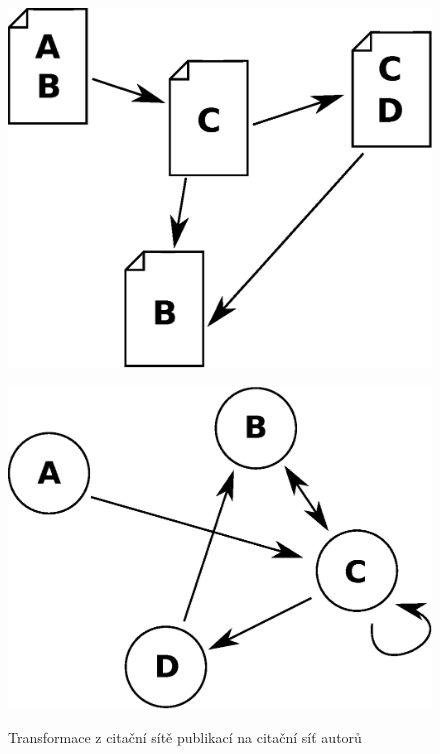 \documentclass{bakalarka}
\begin{document}
\begin{figure}[!ht]
\begin{minipage}[b]{0.45\textwidth}
\centering
	\includegraphics[width=\textwidth]{pubs.eps}
	\label{fig:pubs}
\end{minipage}
\hspace{0.5cm}
\begin{minipage}[b]{0.45\textwidth}
\centering
	\includegraphics[width=\textwidth]{auths.eps}
	\label{fig:auths}
\end{minipage}
\caption{Transformace z citační sítě publikací na citační síť autorů}
\label{fig:transform}
\end{figure}
\end{document}
